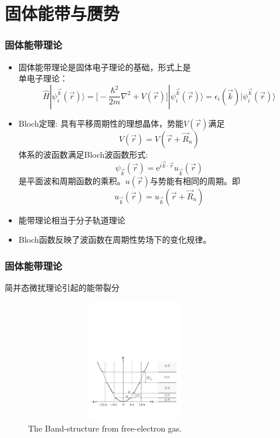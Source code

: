 \section{固体能带与赝势}       %
\frame
{
\frametitle{固体能带理论}
\begin{itemize}%
   \setlength{\itemsep}{8pt}
   \item 固体能带理论是固体电子理论的基础，形式上是\\单电子理论：
    $$\hat H |\psi_i^{\vec k}(\vec r)\rangle=\bigg[-\dfrac{\hbar^2}{2m}\nabla^2+V(\vec r)\bigg]|\psi_i^{\vec k}(\vec r)\rangle=\epsilon_i(\vec k)|\psi_i^{\vec k}(\vec r)\rangle$$
  \item \textrm{Bloch}定理:
具有平移周期性的理想晶体，势能$V(\vec r)$满足$$V(\vec r)=V(\vec r+\vec R_n)$$
体系的波函数满足\textrm{Bloch}波函数形式:$$\psi_{\vec k}(\vec r)=\textrm{e}^{i\vec k\cdot\vec r}u_{\vec k}(\vec r)$$
是平面波和周期函数的乘积。$u(\vec r)$与势能有相同的周期。即$$u_{\vec k}(\vec r)=u_{\vec k}(\vec r+\vec R_n)$$
  \item 能带理论相当于分子轨道理论
\item \textrm{Bloch}函数反映了波函数在周期性势场下的变化规律。
\end{itemize}
}

\frame
{
\frametitle{固体能带理论}
简并态微扰理论引起的能带裂分
\begin{figure}[h!]
\centering
\includegraphics[height=2.1in,width=3.8in,viewport=10 90 570 380,clip]{Figures/Band_Gap.pdf}
\caption{\small \textrm{The Band-structure from free-electron gas.}}%
\label{Band-Structure-1}
\end{figure} 
}

